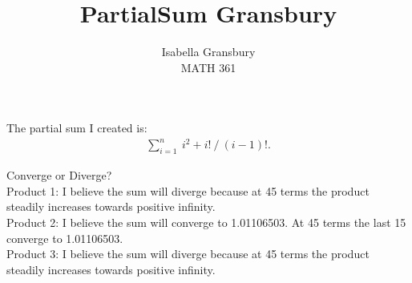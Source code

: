\documentclass[12pt]{article}
\newenvironment{problem}[2][Problem]{\begin{trivlist}
\item[\hskip \labelsep {\bfseries #1}\hskip \labelsep {\bfseries #2.}]}{\end{trivlist}}
\begin{document}
 
 
\title{PartialSum Gransbury}%
\author{Isabella Gransbury\\ %
MATH 361} %
 
\maketitle
 
\begin{problem}{1}The partial sum I created is:
	\begin{align*}
	\sum_{i=1}^{n} \ i^2 + i! \ / \ (i-1)!.
	\end{align*}
\end{problem}

\begin{problem}{2}Converge or Diverge?\\
	Product 1: I believe the sum will diverge because at 45 terms the product steadily increases towards positive infinity.\\
	Product 2: I believe the sum will converge to 1.01106503. At 45 terms the last 15 converge to 1.01106503.\\
	Product 3: I believe the sum will diverge because at 45 terms the product steadily increases towards positive infinity.
\end{problem}
\end{document}
